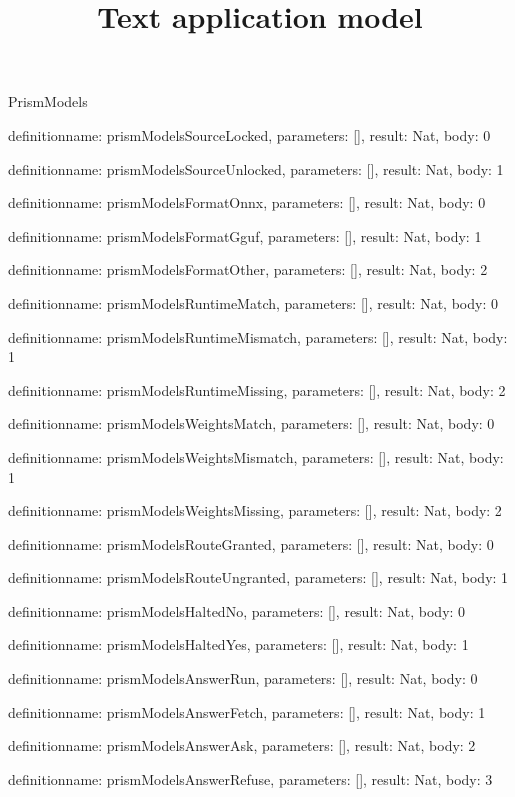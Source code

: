 \begin{lexlean}{PrismModels}
\title{Text application model}
\begin{semanticmodule}
definition{name: prismModelsSourceLocked, parameters: [], result: Nat, body: 0}

definition{name: prismModelsSourceUnlocked, parameters: [], result: Nat, body: 1}

definition{name: prismModelsFormatOnnx, parameters: [], result: Nat, body: 0}

definition{name: prismModelsFormatGguf, parameters: [], result: Nat, body: 1}

definition{name: prismModelsFormatOther, parameters: [], result: Nat, body: 2}

definition{name: prismModelsRuntimeMatch, parameters: [], result: Nat, body: 0}

definition{name: prismModelsRuntimeMismatch, parameters: [], result: Nat, body: 1}

definition{name: prismModelsRuntimeMissing, parameters: [], result: Nat, body: 2}

definition{name: prismModelsWeightsMatch, parameters: [], result: Nat, body: 0}

definition{name: prismModelsWeightsMismatch, parameters: [], result: Nat, body: 1}

definition{name: prismModelsWeightsMissing, parameters: [], result: Nat, body: 2}

definition{name: prismModelsRouteGranted, parameters: [], result: Nat, body: 0}

definition{name: prismModelsRouteUngranted, parameters: [], result: Nat, body: 1}

definition{name: prismModelsHaltedNo, parameters: [], result: Nat, body: 0}

definition{name: prismModelsHaltedYes, parameters: [], result: Nat, body: 1}

definition{name: prismModelsAnswerRun, parameters: [], result: Nat, body: 0}

definition{name: prismModelsAnswerFetch, parameters: [], result: Nat, body: 1}

definition{name: prismModelsAnswerAsk, parameters: [], result: Nat, body: 2}

definition{name: prismModelsAnswerRefuse, parameters: [], result: Nat, body: 3}


\end{semanticmodule}
\end{lexlean}
